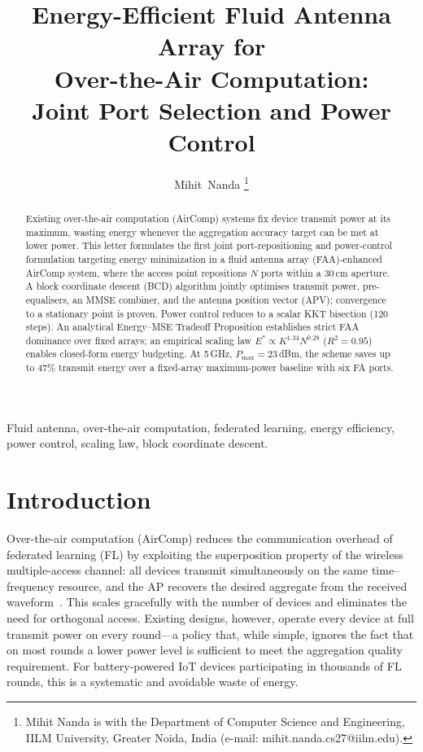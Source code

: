 \documentclass[journal,letterpaper,10pt,twocolumn]{IEEEtran}
\begin{document}
\title{Energy-Efficient Fluid Antenna Array for\\
Over-the-Air Computation:\\
Joint Port Selection and Power Control}

\author{Mihit~Nanda%
\thanks{Mihit Nanda is with the Department of Computer Science and Engineering,
IILM University, Greater Noida, India (e-mail: mihit.nanda.cs27@iilm.edu).}}

\maketitle

\begin{abstract}
Existing over-the-air computation (AirComp) systems fix device transmit
power at its maximum, wasting energy whenever the aggregation accuracy
target can be met at lower power. This letter formulates the first
joint port-repositioning and power-control formulation targeting energy
minimization in a fluid antenna array (FAA)-enhanced AirComp system,
where the access point repositions $N$ ports within a 30\,cm aperture. A block coordinate descent (BCD) algorithm jointly
optimises transmit power, pre-equalisers, an MMSE combiner, and the
antenna position vector (APV); convergence to a stationary point is
proven. Power control reduces to a scalar KKT bisection (120 steps).
An analytical Energy--MSE Tradeoff Proposition establishes strict FAA
dominance over fixed arrays; an empirical scaling law
$E^{*}\!\propto\!K^{1.34}N^{0.28}$ ($R^{2}\!=\!0.95$) enables
closed-form energy budgeting. At 5\,GHz, $P_{\max}\!=\!23$\,dBm, the
scheme saves up to 47\% transmit energy over a fixed-array
maximum-power baseline with six FA ports.
\end{abstract}

\begin{IEEEkeywords}
Fluid antenna, over-the-air computation, federated learning, energy
efficiency, power control, scaling law, block coordinate descent.
\end{IEEEkeywords}

\section{Introduction}

Over-the-air computation (AirComp) reduces the communication overhead
of federated learning (FL) by exploiting the superposition property of
the wireless multiple-access channel: all devices transmit simultaneously
on the same time--frequency resource, and the AP recovers the desired
aggregate from the received waveform~\cite{Goldenbaum2013,Yang2019}.
This scales gracefully with the number of devices and eliminates the
need for orthogonal access. Existing designs, however, operate every
device at full transmit power on every round---a policy that, while
simple, ignores the fact that on most rounds a lower power level is
sufficient to meet the aggregation quality requirement. For
battery-powered IoT devices participating in thousands of FL rounds,
this is a systematic and avoidable waste of energy.
\end{document}
